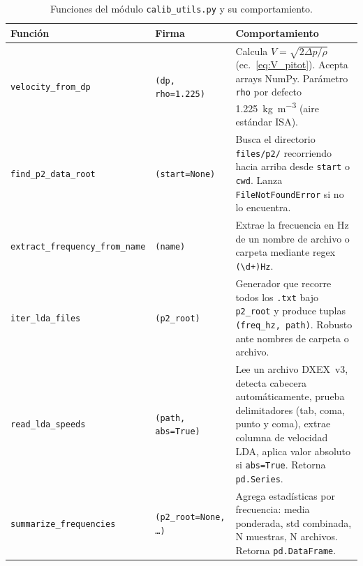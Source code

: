 \documentclass[12pt,a4paper]{article}
\begin{document}
\begin{table}[H]
	\centering
	\caption{Funciones del módulo \texttt{calib\_utils.py} y su comportamiento.}
	\label{tab:funciones}
	\small
	\begin{tabularx}{\textwidth}{l l X}
		\toprule
		\textbf{Función} & \textbf{Firma}                                                        & \textbf{Comportamiento} \\
		\midrule
		\texttt{velocity\_from\_dp}
		                 & \texttt{(dp, rho=1.225)}
		                 & Calcula $V = \sqrt{2\Delta p/\rho}$ (ec.~\ref{eq:V_pitot}).
		Acepta arrays NumPy.  Parámetro \texttt{rho} por defecto
		\SI{1.225}{\kg\per\m\cubed} (aire estándar ISA).                                                                   \\
		\texttt{find\_p2\_data\_root}
		                 & \texttt{(start=None)}
		                 & Busca el directorio \texttt{files/p2/} recorriendo hacia arriba desde
		\texttt{start} o \texttt{cwd}.  Lanza \texttt{FileNotFoundError}
		si no lo encuentra.                                                                                                \\
		\texttt{extract\_frequency\_from\_name}
		                 & \texttt{(name)}
		                 & Extrae la frecuencia en Hz de un nombre de archivo o carpeta
		mediante regex \texttt{(\textbackslash d+)Hz}.                                                                     \\
		\texttt{iter\_lda\_files}
		                 & \texttt{(p2\_root)}
		                 & Generador que recorre todos los \texttt{.txt} bajo \texttt{p2\_root}
		y produce tuplas \texttt{(freq\_hz, path)}.  Robusto ante
		nombres de carpeta o archivo.                                                                                      \\
		\texttt{read\_lda\_speeds}
		                 & \texttt{(path, abs=True)}
		                 & Lee un archivo DXEX~v3, detecta cabecera automáticamente, prueba
		delimitadores (tab, coma, punto y coma), extrae columna de velocidad
		LDA, aplica valor absoluto si \texttt{abs=True}.  Retorna
		\texttt{pd.Series}.                                                                                                \\
		\texttt{summarize\_frequencies}
		                 & \texttt{(p2\_root=None, \ldots)}
		                 & Agrega estadísticas por frecuencia: media ponderada, std combinada,
		N muestras, N archivos.  Retorna \texttt{pd.DataFrame}.                                                            \\

\end{tabularx}
\end{table}
\end{document}
